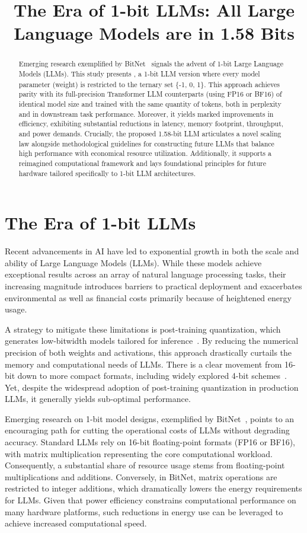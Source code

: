 \title{The Era of 1-bit LLMs: All Large Language Models are in 1.58 Bits}

\begin{abstract}
Emerging research exemplified by BitNet~\cite{bitnet} signals the advent of 1-bit Large Language Models (LLMs). This study presents \textbf{}, a 1-bit LLM version where every model parameter (weight) is restricted to the ternary set \{-1, 0, 1\}. This approach achieves parity with its full-precision Transformer LLM counterparts (using FP16 or BF16) of identical model size and trained with the same quantity of tokens, both in perplexity and in downstream task performance. Moreover, it yields marked improvements in efficiency, exhibiting substantial reductions in latency, memory footprint, throughput, and power demands. Crucially, the proposed 1.58-bit LLM articulates a novel scaling law alongside methodological guidelines for constructing future LLMs that balance high performance with economical resource utilization. Additionally, it supports a reimagined computational framework and lays foundational principles for future hardware tailored specifically to 1-bit LLM architectures.
\end{abstract}

\section{The Era of 1-bit LLMs}

Recent advancements in AI have led to exponential growth in both the scale and ability of Large Language Models (LLMs). While these models achieve exceptional results across an array of natural language processing tasks, their increasing magnitude introduces barriers to practical deployment and exacerbates environmental as well as financial costs primarily because of heightened energy usage.

A strategy to mitigate these limitations is post-training quantization, which generates low-bitwidth models tailored for inference~\cite{smoothquant, gptq, quip, quip_sharp}. By reducing the numerical precision of both weights and activations, this approach drastically curtails the memory and computational needs of LLMs. There is a clear movement from 16-bit down to more compact formats, including widely explored 4-bit schemes~\cite{gptq, awq}. Yet, despite the widespread adoption of post-training quantization in production LLMs, it generally yields sub-optimal performance.

Emerging research on 1-bit model designs, exemplified by BitNet~\cite{bitnet}, points to an encouraging path for cutting the operational costs of LLMs without degrading accuracy. Standard LLMs rely on 16-bit floating-point formats (FP16 or BF16), with matrix multiplication representing the core computational workload. Consequently, a substantial share of resource usage stems from floating-point multiplications and additions. Conversely, in BitNet, matrix operations are restricted to integer additions, which dramatically lowers the energy requirements for LLMs. Given that power efficiency constrains computational performance on many hardware platforms, such reductions in energy use can be leveraged to achieve increased computational speed.

